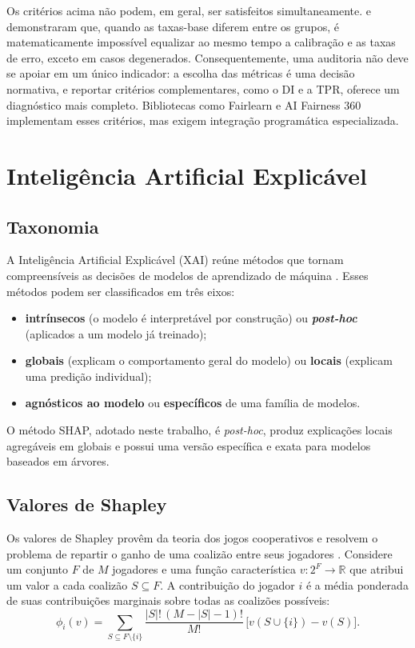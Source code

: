 Os critérios acima não podem, em geral, ser satisfeitos simultaneamente.  e  demonstraram que, quando as taxas-base diferem entre os grupos, é matematicamente impossível equalizar ao mesmo tempo a calibração e as taxas de erro, exceto em casos degenerados. Consequentemente, uma auditoria não deve se apoiar em um único indicador: a escolha das métricas é uma decisão normativa, e reportar critérios complementares, como o DI e a TPR, oferece um diagnóstico mais completo. Bibliotecas como Fairlearn \cite{bird2020fairlearn} e AI Fairness 360 \cite{bellamy2018aif360} implementam esses critérios, mas exigem integração programática especializada.

\section{Inteligência Artificial Explicável}
\label{sec:rt_xai}

\subsection{Taxonomia}

A Inteligência Artificial Explicável (XAI) reúne métodos que tornam compreensíveis as decisões de modelos de aprendizado de máquina \cite{arrieta2020explainable, adadi2018peeking}. Esses métodos podem ser classificados em três eixos:
\begin{itemize}
    \item \textbf{intrínsecos} (o modelo é interpretável por construção) ou \textbf{\textit{post-hoc}} (aplicados a um modelo já treinado);
    \item \textbf{globais} (explicam o comportamento geral do modelo) ou \textbf{locais} (explicam uma predição individual);
    \item \textbf{agnósticos ao modelo} ou \textbf{específicos} de uma família de modelos.
\end{itemize}
O método SHAP, adotado neste trabalho, é \textit{post-hoc}, produz explicações locais agregáveis em globais e possui uma versão específica e exata para modelos baseados em árvores.

\subsection{Valores de Shapley}

Os valores de Shapley provêm da teoria dos jogos cooperativos e resolvem o problema de repartir o ganho de uma coalizão entre seus jogadores \cite{shapley1953value}. Considere um conjunto $F$ de $M$ jogadores e uma função característica $v: 2^F \rightarrow \mathbb{R}$ que atribui um valor a cada coalizão $S \subseteq F$. A contribuição do jogador $i$ é a média ponderada de suas contribuições marginais sobre todas as coalizões possíveis:
\begin{equation}
\phi_i(v) = \sum_{S \subseteq F \setminus \{i\}} \frac{|S|!\,(M - |S| - 1)!}{M!}\, \bigl[ v(S \cup \{i\}) - v(S) \bigr].
\label{eq:rt_shapley}
\end{equation}

